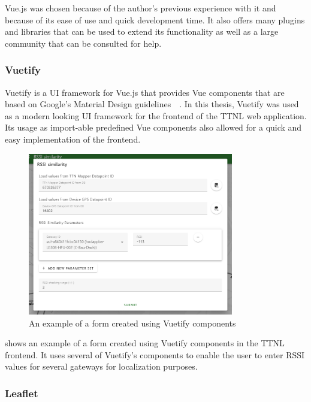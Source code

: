 Vue.js was chosen because of the author's previous experience with it and because of its ease of use and quick development time.
It also offers many plugins and libraries that can be used to extend its functionality as well as a large community that can be consulted for help.

\subsubsection{Vuetify}

Vuetify is a \ac{UI} framework for Vue.js that provides Vue components that are based on Google's Material Design guidelines~\cite{vuetify_vuetify_2023}~\cite{google_llc_material_nodate}.
In this thesis, Vuetify was used as a modern looking \ac{UI} framework for the frontend of the \ac{TTNL} web application.
Its usage as import-able predefined Vue components also allowed for a quick and easy implementation of the frontend.

\begin{figure}
    \centering
    \includegraphics[width=0.8\textwidth]{pictures/ttn-locator/frontend/vuetify-form-example.png}
    \caption{An example of a form created using Vuetify components\label{fig:vuetify-form-example}}
\end{figure}

 shows an example of a form created using Vuetify components in the \ac{TTNL} frontend.
It uses several of Vuetify's components to enable the user to enter \ac{RSSI} values for several gateways for localization purposes.

\subsubsection{Leaflet}

